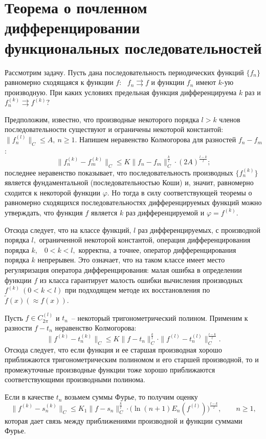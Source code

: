  \section{Теорема о почленном дифференцировании\\ функциональных
 последовательностей}

 Рассмотрим задачу. Пусть дана последовательность периодических
 функций $\{f_n\}$ равномерно сходящаяся к функции $f$:~ $f_n\rightrightarrows
 f$ и функции $f_n$ имеют $k$-ую производную.
 При каких условиях предельная функция дифференцируема $k$
 раз и $f_n^{(k)} \rightrightarrows f^{(k)}?$

Предположим, известно, что производные некоторого порядка  $l>k$ членов
последовательности существуют и ограничены некоторой константой:
 $\|f_n^{(l)}\|_C\le {A},\ n\ge 1.$
 Напишем неравенство Колмогорова для разностей $f_n-f_m$:
  $$
 \|f_n^{(k)}-f_m^{(k)}\|_C\le K \|f_n-f_m\|_C^{\frac{k}{l}}\cdot
 (2{A})^{\frac{l-k}{l}};
 $$
 последнее неравенство показывает, что последовательность производных $\{f_n^{(k)}\}$
 является фундаментальной (последовательностью Коши) и, значит,
 равномерно сходится к некоторой функции $\varphi.$
 Но тогда в силу соответствующей теоремы о равномерно сходящихся
 последовательностях дифференцируемых функций можно утверждать,
 что функция $f$ является $k$ раз дифференцируемой и $\varphi=f^{(k)}$.

 Отсюда следует, что на классе  функций, $l$
 раз дифференцируемых, с производной порядка $l,$ ограниченной некоторой константой,
 операция дифференцирования порядка  $k,$~ $0<k<l,$ корректна, а точнее, оператор
 дифференцирования порядка $k$ непрерывен. Это
 означает, что на таком классе имеет место регуляризация оператора
 дифференцирования: малая ошибка в определении функции $f$
 из класса гарантирует малость ошибки вычисления
 производных $f^{(k)}\ (0<k<l)$ при подходящем методе их
 восстановления по $\widetilde{f}(x) (\approx f(x)).$

 Пусть $f\in {C}^{(l)}_{{2\pi}}$ и $t_n$~--
 некоторый тригонометрический полином.
 Применим к разности $f-t_n$ неравенство Колмогорова:
 $$
 \|f^{(k)}-t_n^{(k)}\|_C\le K \|f-t_n\|_C^{\frac{k}{{l}}}\cdot
 \|f^{(l)}-t_n^{(l)}\|_C^{\frac{l-k}{l}}.
 $$
 Отсюда следует, что если функция и  ее старшая производная
 хорошо приближаются тригонометрическим полиномом и его
 {старшей} производной, то и промежуточные производные
 функции тоже хорошо приближаются
 {соответствующими} {производными полинома}.

 Если в качестве $t_n$ возьмем суммы Фурье, то получим оценку
 $$
   \|f^{(k)}-s_n^{(k)}\|_C\le K_{{1}} \|f-s_n \|_C^{\frac{k}{l}}\cdot
   \Big(\ln (n+1)  {E_n(f^{(l)})\Big)^{\frac{l-k}{l}},\qquad n\ge 1},
 $$
 которая дает связь между приближениями производной и функции
 суммами Фурье.

